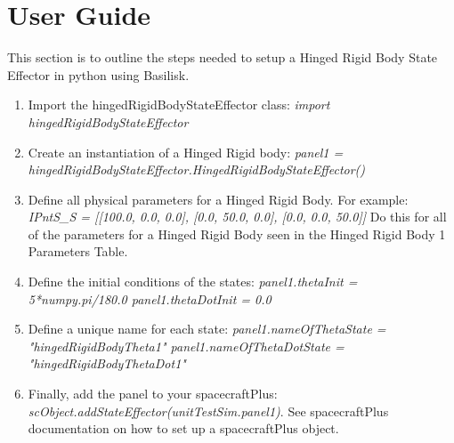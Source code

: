 \section{User Guide}

This section is to outline the steps needed to setup a Hinged Rigid Body State Effector in python using Basilisk.

\begin{enumerate}
	\item Import the hingedRigidBodyStateEffector class: \newline \textit{import hingedRigidBodyStateEffector}
	\item Create an instantiation of a Hinged Rigid body: \newline \textit{panel1 = hingedRigidBodyStateEffector.HingedRigidBodyStateEffector()}
	\item Define all physical parameters for a Hinged Rigid Body. For example: \newline
	\textit{IPntS\_S = [[100.0, 0.0, 0.0], [0.0, 50.0, 0.0], [0.0, 0.0, 50.0]]}
	Do this for all of the parameters for a Hinged Rigid Body seen in the Hinged Rigid Body 1 Parameters Table.
	\item Define the initial conditions of the states:\newline
	\textit{panel1.thetaInit = 5*numpy.pi/180.0 \quad panel1.thetaDotInit = 0.0}
	\item Define a unique name for each state:\newline
	\textit{panel1.nameOfThetaState = "hingedRigidBodyTheta1" \quad panel1.nameOfThetaDotState = "hingedRigidBodyThetaDot1"}
	\item Finally, add the panel to your spacecraftPlus:\newline
	\textit{scObject.addStateEffector(unitTestSim.panel1)}. See spacecraftPlus documentation on how to set up a spacecraftPlus object. 
\end{enumerate}
